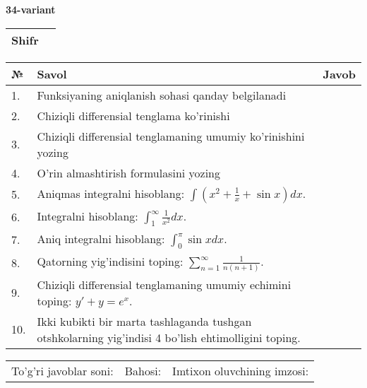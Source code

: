 \documentclass{article}
\begin{document}
  \egroup
  
  \newpage
  
  
  \textbf{34-variant}\\
  
  \bgroup
  \def\arraystretch{1.6} %
  
  \begin{tabular}{|m{5.7cm}|m{9.5cm}|}
  \hline
  Shifr & \\
  \hline
  \end{tabular}
  
  \vspace{1cm}
  
  \begin{tabular}{|m{0.7cm}|m{10cm}|m{4cm}|}
  \hline
  № & Savol & Javob \\
  \hline
  1. & Funksiyaning aniqlanish sohasi qanday belgilanadi &  \\
  \hline
  2. & Chiziqli differensial tenglama ko'rinishi &  \\
  \hline
  3. & Chiziqli differensial tenglamaning umumiy ko'rinishini yozing &  \\
  \hline
  4. & O'rin almashtirish formulasini yozing &  \\
  \hline
  5. & Aniqmas integralni hisoblang: \(\int {\left( x^{2} + \frac{1}{x} + \sin x \right)dx}\). &  \\
  \hline
  6. & Integralni hisoblang: \(\int_{1}^{\infty}{\frac{1}{x^{2}}dx}\). &  \\
  \hline
  7. & Aniq integralni hisoblang: \(\int_{0}^{\pi}{\sin xdx}\). &  \\
  \hline
  8. & Qatorning yig'indisini toping: \(\sum_{n = 1}^{\infty}\frac{1}{n(n + 1)}\). &  \\
  \hline
  9. & Chiziqli differensial tenglamaning umumiy echimini toping: \(y' + y = e^{x}\). &  \\
  \hline
  10. & Ikki kubikti bir marta tashlaganda tushgan otshkolarning yig'indisi 4 bo'lish ehtimolligini toping. &  \\
  \hline
  \end{tabular}
  
  \vspace{1cm}
  
  \begin{tabular}{lll}
  To'g'ri javoblar soni: \underline{\hspace{1.5cm}} & 
  Bahosi: \underline{\hspace{1.5cm}} & 
  Imtixon oluvchining imzosi: \underline{\hspace{2cm}} \\
  \end{tabular}
  
\end{document}
